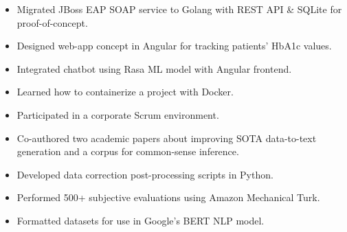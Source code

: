\documentclass[10pt,a4paper,ragged2e]{altacv}
\begin{document}


\begin{fullwidth}
\makecvheader
\end{fullwidth}



\begin{itemize}
\item Migrated JBoss EAP SOAP service to Golang with REST API \& SQLite for proof-of-concept.
\item Designed web-app concept in Angular for tracking patients' HbA1c values.
\item Integrated chatbot using Rasa ML model with Angular frontend.
\item Learned how to containerize a project with Docker. 
\item Participated in a corporate Scrum environment.
\end{itemize}

\divider

\begin{itemize}
\item Co-authored two academic papers about improving SOTA data-to-text generation and a corpus for common-sense inference.
\item Developed data correction post-processing scripts in Python.
\item Performed 500+ subjective evaluations using Amazon Mechanical Turk.
\item Formatted datasets for use in Google's BERT NLP model.
\end{itemize}
\end{document}
